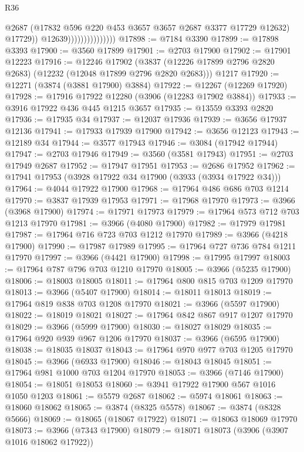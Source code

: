 \begin{lexlean}{R36}
\begin{coremodule}
                                      @2687
                                      (@17832 @596 @220 @453 @3657 @3657 @2687 @3377 @17729 @12632)
                                      @17729))
                                  @12639)))))))))))))))
@17898 := @7184 @3390
@17899 := @17898 @3393
@17900 := @3560 @17899
@17901 := @2703 @17900
@17902 := @17901 @12223
@17916 := @12246
    @17902
    (@3837 (@12226 @17899 @2796 @2820 @2683) (@12232 (@12048 @17899 @2796 @2820 @2683)))
    @1217
@17920 := @12271 (@3874 (@3881 @17900) @3884)
@17922 := @12267 (@12269 @17920)
@17928 := @17916 @17922 @12280 (@3906 (@12283 @17902 @3884))
@17933 := @3916 @17922 @436 @445 @1215 @3657
@17935 := @13559 @3393 @2820
@17936 := @17935 @34
@17937 := @12037 @17936
@17939 := @3656 @17937 @12136
@17941 := @17933 @17939 @17900
@17942 := @3656 @12123
@17943 := @12189 @34
@17944 := @3577 @17943
@17946 := @3084 (@17942 @17944)
@17947 := @2703 @17946
@17949 := @3560 (@3581 @17943)
@17951 := @2703 @17949 @2687
@17952 := @17947 @17951
@17953 := @2686 @17952
@17962 := @17941 @17953 (@3928 @17922 @34 @17900 (@3933 (@3934 @17922 @34)))
@17964 := @4044 @17922 @17900
@17968 := @17964 @486 @686 @703 @1214
@17970 := @3837 @17939 @17953
@17971 := @17968 @17970
@17973 := @3966 (@3968 @17900)
@17974 := @17971 @17973
@17979 := @17964 @573 @712 @703 @1213 @17970
@17981 := @3966 (@4080 @17900)
@17982 := @17979 @17981
@17987 := @17964 @716 @723 @703 @1212 @17970
@17989 := @3966 (@4218 @17900)
@17990 := @17987 @17989
@17995 := @17964 @727 @736 @784 @1211 @17970
@17997 := @3966 (@4421 @17900)
@17998 := @17995 @17997
@18003 := @17964 @787 @796 @703 @1210 @17970
@18005 := @3966 (@5235 @17900)
@18006 := @18003 @18005
@18011 := @17964 @800 @815 @703 @1209 @17970
@18013 := @3966 (@5407 @17900)
@18014 := @18011 @18013
@18019 := @17964 @819 @838 @703 @1208 @17970
@18021 := @3966 (@5597 @17900)
@18022 := @18019 @18021
@18027 := @17964 @842 @867 @917 @1207 @17970
@18029 := @3966 (@5999 @17900)
@18030 := @18027 @18029
@18035 := @17964 @920 @939 @967 @1206 @17970
@18037 := @3966 (@6595 @17900)
@18038 := @18035 @18037
@18043 := @17964 @970 @977 @703 @1205 @17970
@18045 := @3966 (@6933 @17900)
@18046 := @18043 @18045
@18051 := @17964 @981 @1000 @703 @1204 @17970
@18053 := @3966 (@7146 @17900)
@18054 := @18051 @18053
@18060 := @3941 @17922 @17900 @567 @1016 @1050 @1203
@18061 := @5579 @2687
@18062 := @5974 @18061
@18063 := @18060 @18062
@18065 := @3874 (@8325 @5578)
@18067 := @3874 (@8328 @5666)
@18069 := @18065 (@18067 @17922)
@18071 := @18063 @18069 @17970
@18073 := @3966 (@7343 @17900)
@18079 := @18071 @18073 (@3906 (@3907 @1016 @18062 @17922))

\end{coremodule}
\end{lexlean}

